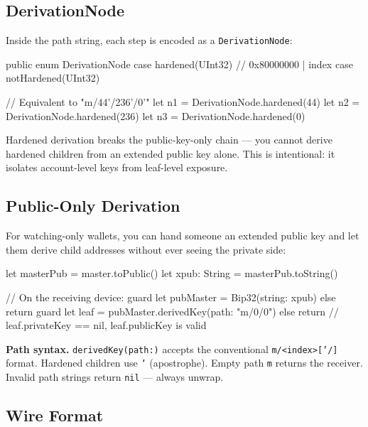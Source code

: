\documentclass[a4paper, 11pt, openany]{book}
\begin{document}
\subsection{DerivationNode}

Inside the path string, each step is encoded as a \texttt{DerivationNode}:

\begin{forthbox}
public enum DerivationNode {
    case hardened(UInt32)  // 0x80000000 | index
    case notHardened(UInt32)
}

// Equivalent to "m/44'/236'/0'"
let n1 = DerivationNode.hardened(44)
let n2 = DerivationNode.hardened(236)
let n3 = DerivationNode.hardened(0)
\end{forthbox}

Hardened derivation breaks the public-key-only chain --- you cannot derive hardened children from an extended public key alone. This is intentional: it isolates account-level keys from leaf-level exposure.

\subsection{Public-Only Derivation}

For watching-only wallets, you can hand someone an extended public key and let them derive child addresses without ever seeing the private side:

\begin{forthbox}
let masterPub = master.toPublic()
let xpub: String = masterPub.toString()

// On the receiving device:
guard let pubMaster = Bip32(string: xpub) else { return }
guard let leaf = pubMaster.derivedKey(path: "m/0/0")
else { return }
// leaf.privateKey == nil, leaf.publicKey is valid
\end{forthbox}

\begin{notebox}
\textbf{Path syntax.} \texttt{derivedKey(path:)} accepts the conventional \texttt{m/<index>['/]} format. Hardened children use \texttt{'} (apostrophe). Empty path \texttt{m} returns the receiver. Invalid path strings return \texttt{nil} --- always unwrap.
\end{notebox}

\subsection{Wire Format}
\end{document}
